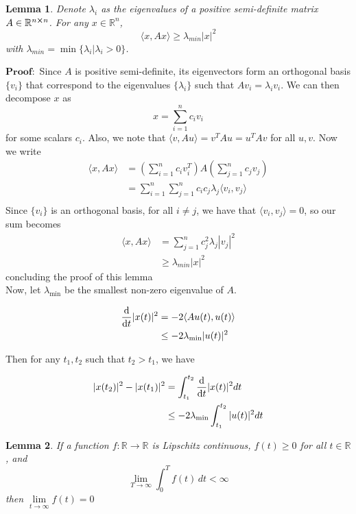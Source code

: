 \documentclass[11pt]{article}
\newtheorem{lemma}{Lemma}
\newcommand{\R}{\mathbb{R}}
\begin{document}
\begin{lemma}
    Denote $\lambda_i$ as the eigenvalues of a positive semi-definite matrix $A \in \R^{n \cross n}$. For any $x\in \R^n$, $$\langle x, Ax\rangle \geq \lambda_{min}|x|^2$$with $\lambda_{min} = \min \{ \lambda_i | \lambda_i > 0\}$.
\end{lemma}

$\mathbf{Proof:}$ Since $A$ is positive semi-definite, its eigenvectors form an orthogonal basis $\{ v_i \}$ that correspond to the eigenvalues $\{\lambda_i\}$ such that $Av_i = \lambda_iv_i$. We can then decompose $x$ as $$x = \sum_{i = 1}^{n}c_iv_i$$for some scalars $c_i$. Also, we note that $\langle v, Au \rangle = v^TAu = u^TAv$ for all $u, v$. Now we write 
\begin{align*}
    \langle x, Ax\rangle &= \left(\sum_{i = 1}^{n}c_iv_i^T\right) A \left(\sum_{j = 1}^{n}c_jv_j\right)\\
    &= \sum_{i = 1}^{n}\sum_{j = 1}^{n}c_ic_j \lambda_j \langle v_i, v_j \rangle\\
\end{align*}
Since $\{ v_i \}$ is an orthogonal basis, for all $i \neq j$, we have that $\langle v_i, v_j \rangle = 0$, so our sum becomes 
\begin{align*}
    \langle x, Ax\rangle & = \sum_{j = 1}^{n}c_j^2 \lambda_j |v_j|^2\\
    &\geq \lambda_{min}|x|^2
\end{align*}
concluding the proof of this lemma\\

Now, let $\lambda_{\min}$ be the smallest non-zero eigenvalue of $A$. 

\begin{align*}
    \dv{}{t}|x(t)|^2 & = -2\langle Au(t), u(t) \rangle\\
    & \leq - 2\lambda_{\min} |u(t)|^2
\end{align*}

Then for any $t_1, t_2$ such that $t_2 > t_1$, we have


\begin{align*}
    |x(t_2)|^2 - |x(t_1)|^2 &= \int _{t_1}^{t_2}\dv{}{t}|x(t)|^2dt\\
    & \leq -2\lambda_{\min}  \int _{t_1}^{t_2}|u(t)|^2dt
\end{align*}


\begin{lemma}
    If a function $f:\R \rightarrow \R$ is Lipschitz continuous, $f(t) \geq 0$ for all $t \in \R$, and $$\lim_{T \rightarrow \infty} \int _0 ^T f(t) \, dt < \infty$$ then $\underset{t \rightarrow \infty}{\lim}f(t) = 0$
\end{lemma}
\end{document}
